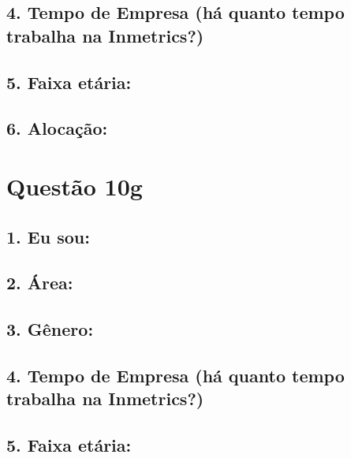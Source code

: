 \documentclass[]{book}
\begin{document}
\hypertarget{tempo-de-empresa-ha-quanto-tempo-trabalha-na-inmetrics-7}{%
\subsection{4. Tempo de Empresa (há quanto tempo trabalha na Inmetrics?)}\label{tempo-de-empresa-ha-quanto-tempo-trabalha-na-inmetrics-7}}

\hypertarget{faixa-etaria-7}{%
\subsection{5. Faixa etária:}\label{faixa-etaria-7}}

\hypertarget{alocacao-7}{%
\subsection{6. Alocação:}\label{alocacao-7}}

\hypertarget{questao-10g}{%
\section{Questão 10g}\label{questao-10g}}

\hypertarget{eu-sou-8}{%
\subsection{1. Eu sou:}\label{eu-sou-8}}

\hypertarget{area-8}{%
\subsection{2. Área:}\label{area-8}}

\hypertarget{genero-8}{%
\subsection{3. Gênero:}\label{genero-8}}

\hypertarget{tempo-de-empresa-ha-quanto-tempo-trabalha-na-inmetrics-8}{%
\subsection{4. Tempo de Empresa (há quanto tempo trabalha na Inmetrics?)}\label{tempo-de-empresa-ha-quanto-tempo-trabalha-na-inmetrics-8}}

\hypertarget{faixa-etaria-8}{%
\subsection{5. Faixa etária:}\label{faixa-etaria-8}}
\end{document}
